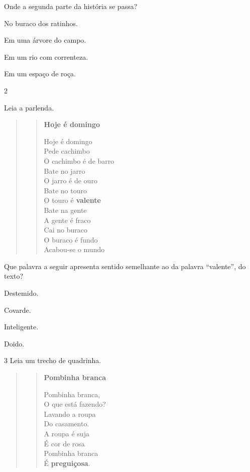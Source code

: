 Onde a segunda parte da história se passa?

\begin{escolha}[itemsep=-5pt]
\item No buraco dos ratinhos.

\item Em uma árvore do campo.

\item Em um rio com correnteza.

\item Em um espaço de roça.
\end{escolha}


\num{2}

Leia a parlenda.

\begin{quote}
\begin{verse}
\textbf{Hoje é domingo}

Hoje é domingo\\
Pede cachimbo\\
O cachimbo é de barro\\
Bate no jarro\\
O jarro é de ouro\\
Bate no touro\\
O touro é \textbf{valente}\\
Bate na gente\\
A gente é fraco\\
Cai no buraco\\
O buraco é fundo\\
Acabou-se o mundo

\end{verse}
\end{quote}

Que palavra a seguir apresenta sentido semelhante ao da palavra
``valente'', do texto?

\begin{escolha}[itemsep=-5pt]
\item Destemido.

\item Covarde.

\item Inteligente.

\item Doido.
\end{escolha}

\num{3} Leia um trecho de quadrinha.

\begin{quote}
\begin{verse}
\textbf{Pombinha branca}

Pombinha branca,\\
O que está fazendo?\\
Lavando a roupa\\
Do casamento.\\
A roupa é suja\\
É cor de rosa\\
Pombinha branca\\
É \textbf{preguiçosa}.

\end{verse}
\end{quote}

